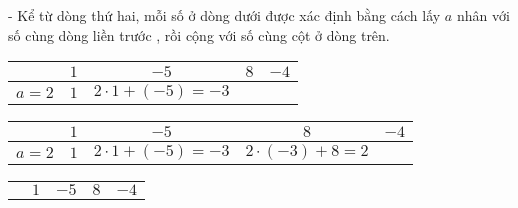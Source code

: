 \begin{enumerate}
\begin{center}
\begin{tabular}{c|c|c|c|c}
	\end{tabular} 
\end{center}
- Kể từ dòng thứ hai, mỗi số ở dòng dưới được xác định bằng cách lấy $a$ nhân với số cùng dòng liền trước , rồi cộng với số cùng cột ở dòng trên.
\begin{center}
	\begin{tabular}{c|c|c|c|c}
		&\hspace{1cm} $1$\hspace{1cm} & \hspace{1cm} $-5$\hspace{1cm}  &\hspace{1cm} $8$ \hspace{1.25cm}  & \hspace{1cm} $-4$ \hspace{1cm}  \\ 
		\hline 
		\hspace{0.5cm} $a=2$\hspace{0.5cm}	&\hspace{1cm} $1$\hspace{1cm}  & $2\cdot 1+(-5)=-3$  &  &
	\end{tabular} 
\end{center}
\begin{center}
	\begin{tabular}{c|c|c|c|c}
		&\hspace{1cm} $1$\hspace{1cm} & \hspace{1cm} $-5$\hspace{1cm}  &\hspace{1cm} $8$ \hspace{1cm}  & \hspace{1cm} $-4$ \hspace{1cm}  \\ 
		\hline 
		\hspace{0.5cm} $a=2$\hspace{0.5cm}	&\hspace{1cm} $1$\hspace{1cm}  & $2\cdot 1+(-5)=-3$  & $2\cdot (-3)+8=2$  &
	\end{tabular} 
\end{center}
\begin{center}
	\begin{tabular}{c|c|c|c|c}
		&\hspace{1cm} $1$\hspace{1cm} & \hspace{1cm} $-5$\hspace{1cm}  &\hspace{1cm} $8$ \hspace{1cm}  & \hspace{1cm} $-4$ \hspace{1cm}  \\ 

\end{tabular}
\end{center}
\end{enumerate}
